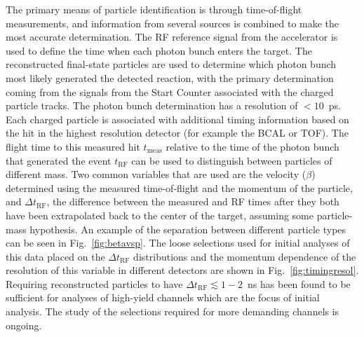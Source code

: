 The primary means of particle identification is through time-of-flight measurements, and information from several sources is combined to make the most accurate determination.  The RF reference signal from the accelerator is used to define the time when each photon bunch enters the target.  The reconstructed final-state particles are used to determine which photon bunch most likely generated the detected reaction, with the primary determination coming from the signals from the Start Counter associated with the charged particle tracks.  The photon bunch determination has a resolution of $<10$~ps. Each charged particle is associated with additional timing information based on the hit in the highest resolution detector (for example the BCAL or TOF).  The flight  time to this measured hit $t_\mathrm{meas}$ relative to the time of the photon bunch that generated the event $t_\mathrm{RF}$ can be used to distinguish between particles of different mass.  Two common variables that are used are the velocity ($\beta$) determined using the measured time-of-flight and the momentum of the particle, and $\Delta t_\mathrm{RF}$, the difference between the measured and RF times after they both have been extrapolated back to the center of the target, assuming some particle-mass hypothesis.
An example of the separation between different particle types can be seen in Fig.~\ref{fig:betavsp}.
The loose selections used for initial analyses of this data placed on the $\Delta t_\mathrm{RF}$ distributions and the momentum dependence of the resolution of this variable in different detectors are shown in Fig.~\ref{fig:timingresol}.  
Requiring reconstructed particles to have  $\Delta t_\mathrm{RF} \lesssim 1-2$~ns has been found to be sufficient for analyses of high-yield channels which are the focus of initial analysis.  The study of the selections required for more demanding channels is ongoing.

